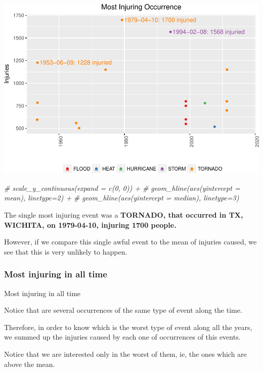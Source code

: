 \documentclass[]{article}
\newenvironment{Shaded}{\begin{snugshade}}{\end{snugshade}}
\newcommand{\CommentTok}[1]{\textcolor[rgb]{0.56,0.35,0.01}{\textit{{#1}}}}
\begin{document}
\includegraphics{readme_files/figure-latex/injuring-single-plot-1.pdf}

\begin{Shaded}
\begin{Highlighting}[]
        \CommentTok{# scale_y_continuous(expand = c(0, 0)) +}
        \CommentTok{# geom_hline(aes(yintercept = mean), linetype=2) +}
        \CommentTok{# geom_hline(aes(yintercept = median), linetype=3)}
\end{Highlighting}
\end{Shaded}

The single most injuring event was a \textbf{TORNADO, that occurred in
TX, WICHITA, on 1979-04-10, injuring 1700 people.}

However, if we compare this single awful event to the mean of injuries
caused, we see that this is very unlikely to happen.

\subsubsection{Most injuring in all
time}\label{most-injuring-in-all-time}

Most injuring in all time

Notice that are several occurrences of the same type of event along the
time.

Therefore, in order to know which is the worst type of event along all
the years, we summed up the injuries caused by each one of occurrences
of this events.

Notice that we are interested only in the worst of them, ie, the ones
which are above the mean.
\end{document}
